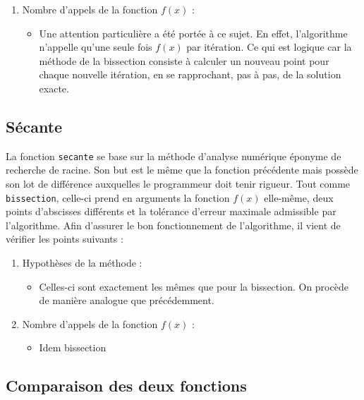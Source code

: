 \documentclass[12pt]{article}
\begin{document}
\begin{enumerate}[label=\roman*.]
\begin{itemize}
                \end{itemize}
            \item 
            Nombre d'appels de la fonction $f(x)$ :
                \begin{itemize}
                    \item Une attention particulière a été portée à ce sujet. En effet, l'algorithme n'appelle qu'une seule fois $f(x)$ par itération. Ce qui est logique car la méthode de la bissection consiste à calculer un nouveau point pour chaque nouvelle itération, en se rapprochant, pas à pas, de la solution exacte.
                \end{itemize}
        \end{enumerate}
    
    \subsection{Sécante}
        La fonction \texttt{secante} se base sur la méthode d'analyse numérique éponyme de recherche de racine. Son but est le même que la fonction précédente mais possède son lot de différence auxquelles le programmeur doit tenir rigueur. Tout comme \texttt{bissection}, celle-ci prend en arguments la fonction $f(x)$ elle-même, deux points d'abscisses différents et la tolérance d'erreur maximale admissible par l'algorithme. Afin d'assurer le bon fonctionnement de l'algorithme, il vient de vérifier les points suivants :
    \begin{enumerate}[label=\roman*.]
        \item Hypothèses de la méthode : 
            \begin{itemize}
                \item Celles-ci sont exactement les mêmes que pour la bissection. On procède de manière analogue que précédemment.
            \end{itemize}
            
        \item 
        Nombre d'appels de la fonction $f(x)$ : 
            \begin{itemize}
                \item Idem bissection
            \end{itemize}
            
    \end{enumerate}
    
    \subsection{Comparaison des deux fonctions}
    
\end{document}
